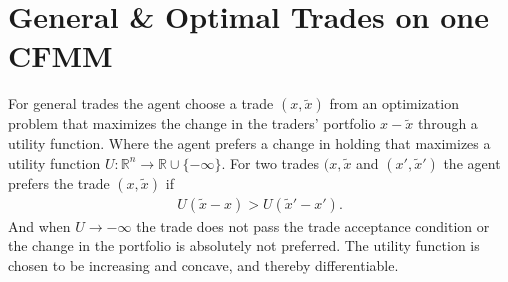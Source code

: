 \section{General \& Optimal Trades on one CFMM}
For general trades the agent choose a trade $(x, \tilde{x})$ from an
optimization problem that maximizes the change in the traders' portfolio $x
-\tilde{x}$ through a utility function. Where the agent prefers a change in
holding that maximizes a utility function $U: \mathbb{R}^{n}  \to \mathbb{R}
\cup \{-\infty\} $. For two trades $(x, \tilde{x}$ and $(x', \tilde{x}')$ the
agent prefers the trade $(x, \tilde{x})$ if
\begin{align}
    U(\tilde{x} -x) > U(\tilde{x}' - x').
\end{align}
And when $U \to -\infty$ the trade does not pass the trade acceptance
condition or the change in the portfolio is absolutely not preferred. The
utility function is chosen to be increasing and concave, and thereby differentiable.

